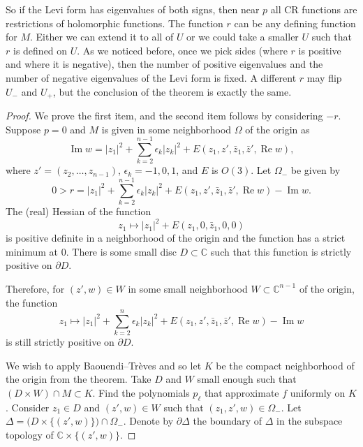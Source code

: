 \documentclass[12pt,openany]{book}
\renewcommand{\Re}{\operatorname{Re}}
\renewcommand{\Im}{\operatorname{Im}}
\newcommand{\sabs}[1]{\lvert {#1} \rvert}
\newcommand{\C}{{\mathbb{C}}}
\theoremstyle{plain}
\theoremstyle{remark}
\theoremstyle{definition}
\theoremstyle{exercise}
\theoremstyle{example}
\begin{document}
So if the Levi form has eigenvalues of both signs,
then near $p$ all CR functions are restrictions of holomorphic
functions.
The function $r$ can be any defining
function for $M$.  Either we can extend it to all of $U$ or we could take a
smaller $U$ such that $r$ is defined on $U$.  As we noticed before,
once we pick sides (where $r$ is positive and where it is negative), then
the number of positive eigenvalues and the number of negative eigenvalues of
the Levi form is fixed.  A different $r$ may flip $U_-$
and $U_+$, but the conclusion of the theorem is exactly the same.

\begin{proof}
We prove the first item, and the second item follows by considering $-r$.
Suppose $p = 0$ and $M$ is given in some neighborhood
$\Omega$ of the origin as
\begin{equation*}
\Im w = \sabs{z_1}^2 + \sum_{k=2}^{n-1} \epsilon_k \sabs{z_k}^2 +
E(z_1,z',\bar{z}_1,\bar{z}',\Re w) ,
\end{equation*}
where $z' = (z_2,\ldots,z_{n-1})$, $\epsilon_k = -1,0,1$,
and $E$ is $O(3)$.
Let $\Omega_-$ be given by
\begin{equation*}
0 > r = \sabs{z_1}^2 + \sum_{k=2}^{n-1} \epsilon_k \sabs{z_k}^2 +
E(z_1,z',\bar{z}_1,\bar{z}',\Re w) - \Im w .
\end{equation*}
The (real) Hessian of the function
\begin{equation*}
z_1 \mapsto \sabs{z_1}^2 +
E(z_1,0,\bar{z}_1,0,0)
\end{equation*}
is positive definite in a
neighborhood of the origin and the function has a strict minimum at 0.
There is some small disc $D \subset \C$ such
that this function is strictly positive on $\partial D$.

Therefore, for $(z',w) \in W$ in some
small neighborhood $W \subset \C^{n-1}$ of the origin,
the function
\begin{equation*}
z_1 \mapsto \sabs{z_1}^2 + \sum_{k=2}^n \epsilon_k \sabs{z_k}^2 +
E(z_1,z',\bar{z}_1,\bar{z}',\Re w) - \Im w
\end{equation*}
is still strictly positive on $\partial D$.

We wish to apply
Baouendi--Tr{\`e}ves and so let $K$ be the compact neighborhood of the
origin from the theorem.  Take $D$ and $W$ small enough such
that $(D \times W) \cap M \subset K$.
Find the polynomials $p_\ell$ that approximate $f$ uniformly on $K$.
Consider $z_1 \in D$ and $(z',w) \in W$ such that
$(z_1,z',w) \in \Omega_-$.
Let
$\Delta = \bigl( D \times \{ (z',w) \} \bigr) \cap \Omega_-$.
Denote by $\partial \Delta$ the boundary of $\Delta$ in the subspace topology
of $\C \times \{ (z',w) \}$.


\end{proof}
\end{document}
